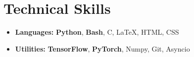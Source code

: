 \section*{Technical Skills}
\begin{itemize}[itemsep=0mm]

    \item \textbf{Languages:} \textbf{Python}, \textbf{Bash}, C, \LaTeX, HTML, CSS
    \item \textbf{Utilities:} \textbf{TensorFlow}, \textbf{PyTorch}, Numpy, Git, Asyncio

\end{itemize}
